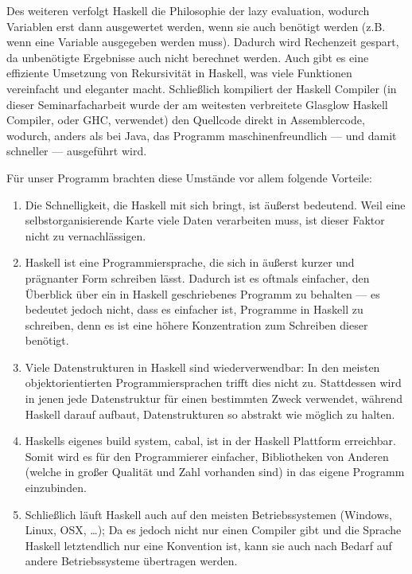 \documentclass[twoside,a4paper,draft]{article}
\begin{document}
Des weiteren verfolgt Haskell die Philosophie der \glqq{}lazy evaluation\grqq{}, wodurch Variablen erst dann ausgewertet werden, wenn sie auch benötigt werden (z.B. wenn eine Variable ausgegeben werden muss). Dadurch wird Rechenzeit gespart, da unbenötigte Ergebnisse auch nicht berechnet werden. Auch gibt es eine effiziente Umsetzung von Rekursivität in Haskell, was viele Funktionen vereinfacht und eleganter macht. Schließlich kompiliert der Haskell Compiler (in dieser Seminarfacharbeit wurde der am weitesten verbreitete Glasglow Haskell Compiler, oder GHC, verwendet) den Quellcode direkt in Assemblercode, wodurch, anders als bei Java, das Programm maschinenfreundlich --- und damit schneller --- ausgeführt wird.

Für unser Programm brachten diese Umstände vor allem folgende Vorteile:

\begin{enumerate}
\item Die Schnelligkeit, die Haskell mit sich bringt, ist äußerst bedeutend. Weil eine selbstorganisierende Karte viele Daten verarbeiten muss, ist dieser Faktor nicht zu vernachlässigen.

\item Haskell ist eine Programmiersprache, die sich in äußerst kurzer und prägnanter Form schreiben lässt. Dadurch ist es oftmals einfacher, den Überblick über ein in Haskell geschriebenes Programm zu behalten --- es bedeutet jedoch nicht, dass es einfacher ist, Programme in Haskell zu schreiben, denn es ist eine höhere Konzentration zum Schreiben dieser benötigt.

\item Viele Datenstrukturen in Haskell sind wiederverwendbar: In den meisten objektorientierten Programmiersprachen trifft dies nicht zu. Stattdessen wird in jenen jede Datenstruktur für einen bestimmten Zweck verwendet, während Haskell darauf aufbaut, Datenstrukturen so abstrakt wie möglich zu halten.

\item Haskells eigenes \glqq{}build system\grqq{}, cabal, ist in der Haskell Plattform erreichbar. Somit wird es für den Programmierer einfacher, Bibliotheken von Anderen (welche in großer Qualität und Zahl vorhanden sind) in das eigene Programm einzubinden.

\item Schließlich läuft Haskell auch auf den meisten Betriebssystemen (Windows, Linux, OSX, \dots{}); Da es jedoch nicht nur einen Compiler gibt und die Sprache Haskell letztendlich nur eine Konvention ist, kann sie auch nach Bedarf auf andere Betriebssysteme übertragen werden.
\end{enumerate}
\end{document}
